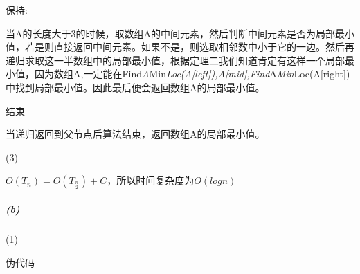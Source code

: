 \documentclass[
]{article}
\begin{document}
保持:

当A的长度大于3的时候，取数组A的中间元素，然后判断中间元素是否为局部最小值，若是则直接返回中间元素。如果不是，则选取相邻数中小于它的一边。然后再递归求取这一半数组中的局部最小值，根据定理二我们知道肯定有这样一个局部最小值，因为数组A,一定能在Find\emph{A}Min\emph{Loc(A{[}left{]}),A{[}mid{]},Find}A\emph{Min}Loc(A{[}right{]})中找到局部最小值。因此最后便会返回数组A的局部最小值。

结束

当递归返回到父节点后算法结束，返回数组A的局部最小值。

(3)

\(O(T_n)=O(T_{\frac{n}{2}})+C\)，所以时间复杂度为\(O(logn)\)

\hypertarget{header-n72}{%
\subparagraph{(b)}\label{header-n72}}

(1)

伪代码
\end{document}
